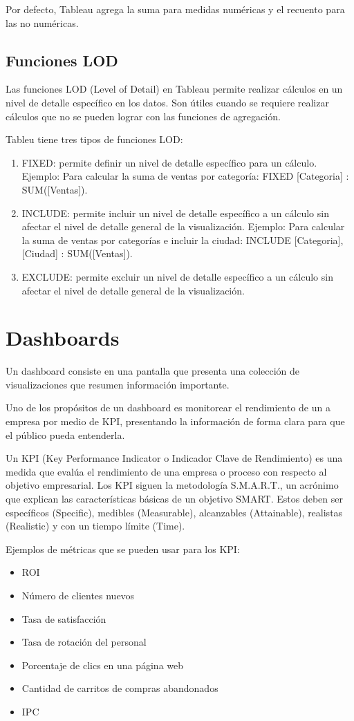 \documentclass[a4paper, 12pt]{book}
\begin{document}
Por defecto, Tableau agrega la suma para medidas numéricas y el recuento para las no numéricas.
\subsection{Funciones LOD}
Las funciones LOD (Level of Detail) en Tableau permite realizar cálculos en un nivel de detalle específico en los datos. Son útiles cuando se requiere realizar cálculos que no se pueden lograr con las funciones de agregación.

Tableu tiene tres tipos de funciones LOD:
\begin{enumerate}
	\item FIXED: permite definir un nivel de detalle específico para un cálculo. Ejemplo: Para calcular la suma de ventas por categoría: {FIXED [Categoria] : SUM([Ventas])}.
	\item INCLUDE: permite incluir un nivel de detalle específico a un cálculo sin afectar el nivel de detalle general de la visualización. Ejemplo: Para calcular la suma de ventas por categorías e incluir la ciudad: {INCLUDE [Categoria],[Ciudad] : SUM([Ventas])}.
	\item EXCLUDE: permite excluir un nivel de detalle específico a un cálculo sin afectar el nivel de detalle general de la visualización.
\end{enumerate}

\section{Dashboards}
Un dashboard consiste en una pantalla que presenta una colección de visualizaciones que resumen información importante.

Uno de los propósitos de un dashboard es monitorear el rendimiento de un a empresa por medio de KPI, presentando la información de forma clara para que el público pueda entenderla.

Un KPI (Key Performance Indicator o Indicador Clave de Rendimiento) es una medida que evalúa el rendimiento de una empresa o proceso con respecto al objetivo empresarial. Los KPI siguen la metodología S.M.A.R.T., un acrónimo que explican las características básicas de un objetivo SMART. Estos deben ser específicos (Specific), medibles (Measurable), alcanzables (Attainable), realistas (Realistic) y con un tiempo límite (Time).

Ejemplos de métricas que se pueden usar para los KPI:
\begin{itemize}
	\item ROI
	\item Número de clientes nuevos
	\item Tasa de satisfacción
	\item Tasa de rotación del personal
	\item Porcentaje de clics en una página web
	\item Cantidad de carritos de compras abandonados
	\item IPC
\end{itemize}
\end{document}
